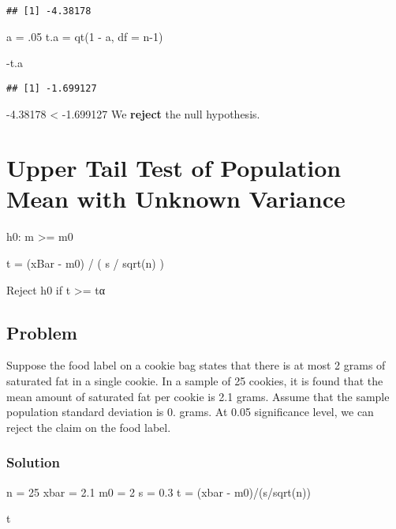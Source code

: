\documentclass[
]{article}
\newenvironment{Shaded}{\begin{snugshade}}{\end{snugshade}}
\newcommand{\AttributeTok}[1]{\textcolor[rgb]{0.77,0.63,0.00}{#1}}
\newcommand{\DecValTok}[1]{\textcolor[rgb]{0.00,0.00,0.81}{#1}}
\newcommand{\FloatTok}[1]{\textcolor[rgb]{0.00,0.00,0.81}{#1}}
\newcommand{\FunctionTok}[1]{\textcolor[rgb]{0.00,0.00,0.00}{#1}}
\newcommand{\NormalTok}[1]{#1}
\newcommand{\OtherTok}[1]{\textcolor[rgb]{0.56,0.35,0.01}{#1}}
\newcommand{\SpecialCharTok}[1]{\textcolor[rgb]{0.00,0.00,0.00}{#1}}
\begin{document}
\begin{verbatim}
## [1] -4.38178
\end{verbatim}

\begin{Shaded}
\begin{Highlighting}[]
\NormalTok{a }\OtherTok{=}\NormalTok{ .}\DecValTok{05}
\NormalTok{t.a }\OtherTok{=} \FunctionTok{qt}\NormalTok{(}\DecValTok{1} \SpecialCharTok{{-}}\NormalTok{ a, }\AttributeTok{df =}\NormalTok{ n}\DecValTok{{-}1}\NormalTok{)}

\SpecialCharTok{{-}}\NormalTok{t.a}
\end{Highlighting}
\end{Shaded}

\begin{verbatim}
## [1] -1.699127
\end{verbatim}

-4.38178 \textless{} -1.699127 We \textbf{reject} the null hypothesis.

\hypertarget{upper-tail-test-of-population-mean-with-unknown-variance}{%
\section{Upper Tail Test of Population Mean with Unknown
Variance}\label{upper-tail-test-of-population-mean-with-unknown-variance}}

h0: m \textgreater= m0

t = (xBar - m0) / ( s / sqrt(n) )

Reject h0 if t \textgreater= tα

\hypertarget{problem-14}{%
\subsection{Problem}\label{problem-14}}

Suppose the food label on a cookie bag states that there is at most 2
grams of saturated fat in a single cookie. In a sample of 25 cookies, it
is found that the mean amount of saturated fat per cookie is 2.1 grams.
Assume that the sample population standard deviation is 0. grams. At
0.05 significance level, we can reject the claim on the food label.

\hypertarget{solution-16}{%
\subsubsection{Solution}\label{solution-16}}

\begin{Shaded}
\begin{Highlighting}[]
\NormalTok{n }\OtherTok{=} \DecValTok{25}
\NormalTok{xbar }\OtherTok{=} \FloatTok{2.1}
\NormalTok{m0 }\OtherTok{=} \DecValTok{2}
\NormalTok{s }\OtherTok{=} \FloatTok{0.3}
\NormalTok{t }\OtherTok{=}\NormalTok{ (xbar }\SpecialCharTok{{-}}\NormalTok{ m0)}\SpecialCharTok{/}\NormalTok{(s}\SpecialCharTok{/}\FunctionTok{sqrt}\NormalTok{(n))}

\NormalTok{t}
\end{Highlighting}
\end{Shaded}
\end{document}

